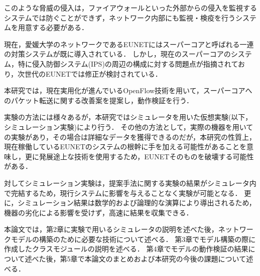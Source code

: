 このような脅威の侵入は，ファイアウォールといった外部からの侵入を監視するシステムでは防ぐことができず，ネットワーク内部にも監視・検疫を行うシステムを用意する必要がある．

現在，愛媛大学のネットワークであるEUNETにはスーパーコアと呼ばれる一連の対策システムが既に導入されている．
しかし，現在のスーパーコアのシステム，特に侵入防御システム(IPS)の周辺の構成に対する問題点が指摘されており，次世代のEUNETでは修正が検討されている．

本研究では，現在実用化が進んでいるOpenFlow技術を用いて，スーパーコアへのパケット転送に関する改善案を提案し，動作検証を行う．

実験の方法には様々あるが，本研究ではシミュレータを用いた仮想実験(以下，シミュレーション実験)により行う．
その他の方法として，実際の機器を用いての実験があり，その場合は詳細なデータを獲得できるのだが，本研究の性質上，現在稼働しているEUNETのシステムの根幹に手を加える可能性があることを意味し，更に発展途上な技術を使用するため，EUNETそのものを破壊する可能性がある．

対してシミュレーション実験は，提案手法に関する実験の結果がシミュレータ内で完結するため，現行システムに影響を与えることなく実験が可能となる．
更に，シミュレーション結果は数学的および論理的な演算により導出されるため，機器の劣化による影響を受けず，高速に結果を収集できる．

本論文では，第2章に実験で用いるシミュレータの説明を述べた後，ネットワークモデルの構築のために必要な技術について述べる．
第3章でモデル構築の際に作成したクラスモジュールの説明を述べる．
第4章でモデルの動作検証の結果について述べた後，第5章で本論文のまとめおよび本研究の今後の課題について述べる．